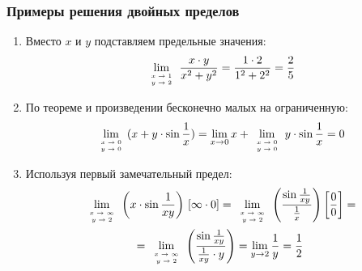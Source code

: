 \subsubsection*{Примеры решения двойных пределов}
\begin{enumerate}
	\item Вместо $x$ и $y$ подставляем предельные значения:
	\begin{align*}
		\lim_{\tiny{\begin{array}[b]{c} x \to 1\\y \to 2 \end{array}}} \frac{x \cdot y}{x^2 + y^2} =
		\frac{1 \cdot 2}{1^2 + 2^2} =
		\frac{2}{5}
	\end{align*}

	\item По теореме и произведении бесконечно малых на ограниченную:
	\begin{align*}
		\lim_{\tiny{\begin{array}[b]{c} x \to 0\\y \to 0 \end{array}}} (x + y \cdot \sin \frac{1}{x}) =
		\lim_{x \to 0} x + \lim_{\tiny{\begin{array}[b]{c} x \to 0\\y \to 0 \end{array}}} y \cdot \sin \frac{1}{x} =
		0
	\end{align*}

	\item Используя первый замечательный предел:
	\begin{multline*}
		\lim_{\tiny{\begin{array}[b]{c} x \to \infty \\y \to 2 \end{array}}} \left(x \cdot \sin \frac{1}{xy}\right) \, [\infty \cdot 0] =
		\lim_{\tiny{\begin{array}[b]{c} x \to \infty \\y \to 2 \end{array}}} \left(\frac{\sin \frac{1}{xy}}{\frac{1}{x}}\right) \left[\frac{0}{0}\right] =\\=
		\lim_{\tiny{\begin{array}[b]{c} x \to \infty \\y \to 2 \end{array}}} \left(\frac{\sin \frac{1}{xy}}{\frac{1}{xy} \cdot y}\right) =
		\lim_{y \to 2} \frac{1}{y} = \frac{1}{2}
	\end{multline*}


\end{enumerate}
